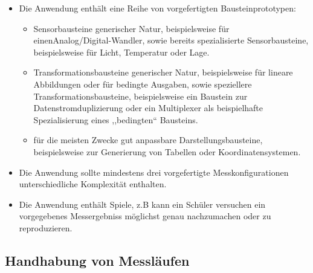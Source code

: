 \documentclass[parskip=full]{scrartcl}
\begin{document}
\begin{itemize}
	
	\item Die Anwendung enthält eine Reihe von vorgefertigten Bausteinprototypen: 
	\begin{itemize}
		
		\item 
		\begin{MussKrit} 		
			Sensorbausteine generischer Natur, beispielsweise für einen\newline Analog/Digital-Wandler, sowie bereits spezialisierte Sensorbausteine, beispielsweise für Licht, Temperatur oder Lage.	
		\end{MussKrit} 
		
		\item 
		\begin{MussKrit} 		
			Transformationsbausteine generischer Natur, beispielsweise für lineare Abbildungen oder für bedingte Ausgaben, sowie speziellere Transformationsbausteine, beispielsweise ein Baustein zur Datenstromduplizierung oder ein Multiplexer als beispielhafte Spezialisierung eines ,,bedingten`` Bausteins. 
				
		\end{MussKrit}
		
		\item 
		\begin{MussKrit} 	
			für die meisten Zwecke gut anpassbare Darstellungsbausteine, beispielsweise zur Generierung von Tabellen oder Koordinatensystemen.					
		\end{MussKrit}
	\end{itemize}
	
	\item 
	\begin{SollKrit} 
		Die Anwendung sollte mindestens drei vorgefertigte Messkonfigurationen unterschiedliche Komplexität enthalten. 			
	\end{SollKrit}

	\item
	\begin{WunschKrit}
Die Anwendung enthält Spiele, z.B kann ein Schüler versuchen ein vorgegebenes Messergebniss möglichst genau nachzumachen oder zu reproduzieren.
\end{WunschKrit}

	
\end{itemize}


\subsection{Handhabung von Messläufen}
\end{document}
